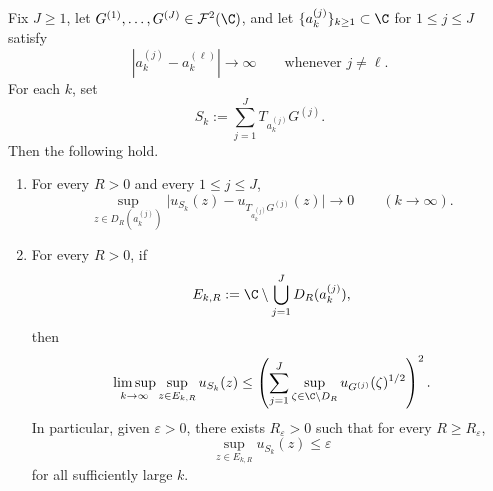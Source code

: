 \begin{lemma}\label{lem:pointwise-decoupling-global}
Fix \(J\ge 1\), let \(G^{(1)},\dots,G^{(J)}\in \mathcal F^2(\C)\), and let
\(\{a_k^{(j)}\}_{k\ge 1}\subset \C\) for \(1\le j\le J\) satisfy
\[
|a_k^{(j)}-a_k^{(\ell)}|\to\infty
\qquad\text{whenever }j\neq \ell.
\]
For each \(k\), set
\[
S_k:=\sum_{j=1}^J T_{a_k^{(j)}}G^{(j)}.
\]
Then the following hold.
\begin{enumerate}
\item[(i)] For every \(R>0\) and every \(1\le j\le J\),
\[
\sup_{z\in D_R(a_k^{(j)})}
\big|u_{S_k}(z)-u_{T_{a_k^{(j)}}G^{(j)}}(z)\big|
\to 0
\qquad (k\to\infty).
\]

\item[(ii)] For every \(R>0\), if
\[
E_{k,R}:=\C\setminus \bigcup_{j=1}^J D_R(a_k^{(j)}),
\]
then
\[
\limsup_{k\to\infty}\sup_{z\in E_{k,R}}u_{S_k}(z)
\le
\left(
\sum_{j=1}^J
\sup_{\zeta\in \C\setminus D_R} u_{G^{(j)}}(\zeta)^{1/2}
\right)^2.
\]
In particular, given \(\varepsilon>0\), there exists \(R_\varepsilon>0\) such that
for every \(R\ge R_\varepsilon\),
\[
\sup_{z\in E_{k,R}}u_{S_k}(z)\le \varepsilon
\]
for all sufficiently large \(k\).
\end{enumerate}
\end{lemma}

